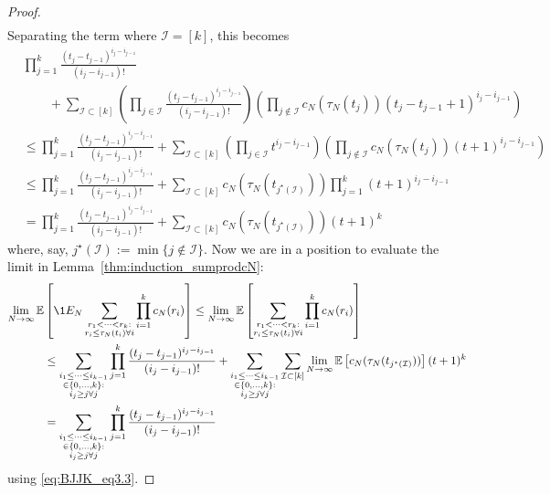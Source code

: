 \begin{proof}
\begin{align*}
\end{align*}
Separating the term where $\mathcal{I} = [k]$, this becomes
\begin{align*}        
& \prod_{j=1}^k \frac{(t_j - t_{j-1})^{i_j - i_{j-1}}}{(i_j - i_{j-1})!} \\
    &\qquad+ \sum_{\mathcal{I} \subset [k]} \left( \prod_{j\in\mathcal{I}} 
        \frac{(t_j - t_{j-1})^{i_j - i_{j-1}}}{(i_j - i_{j-1})!}\right)
        \left( \prod_{j\notin\mathcal{I}} c_N(\tau_N(t_j)) 
        ( t_j - t_{j-1} +1 )^{i_j - i_{j-1}} \right) \\
&\leq \prod_{j=1}^k \frac{(t_j - t_{j-1})^{i_j - i_{j-1}}}{(i_j - i_{j-1})!} 
    + \sum_{\mathcal{I} \subset [k]} \left( \prod_{j\in\mathcal{I}} 
        t^{i_j - i_{j-1}}\right)
        \left( \prod_{j\notin\mathcal{I}} c_N(\tau_N(t_j)) 
        (t+1)^{i_j - i_{j-1}} \right) \\
&\leq \prod_{j=1}^k \frac{(t_j - t_{j-1})^{i_j - i_{j-1}}}{(i_j - i_{j-1})!}
        + \sum_{\mathcal{I} \subset [k]} c_N(\tau_N(t_{j^\star(\mathcal{I})})) 
        \prod_{j=1}^k ( t+1 )^{i_j - i_{j-1}} \\
&=  \prod_{j=1}^k \frac{(t_j - t_{j-1})^{i_j - i_{j-1}}}{(i_j - i_{j-1})!}
        + \sum_{\mathcal{I} \subset [k]} c_N(\tau_N(t_{j^\star(\mathcal{I})})) 
        ( t+1 )^k 
\end{align*}
where, say, $j^\star(\mathcal{I}) := \min\{ j\notin\mathcal{I}\}$.
Now we are in a position to evaluate the limit in Lemma~\ref{thm:induction_sumprodcN}:
\begin{align*}
\lim_{N\to\infty} \E &\left[ \1{E_N} 
        \sum_{\substack{r_1<\dots<r_k :\\ r_i\leq \tau_N(t_i) \forall i}} 
        \prod_{i=1}^k c_N(r_i) \right] 
\leq \lim_{N\to\infty} \E \left[\sum_{\substack{r_1<\dots<r_k :\\ 
        r_i\leq \tau_N(t_i) \forall i}} \prod_{i=1}^k c_N(r_i) \right] \\
&\leq \sum_{\substack{i_1\leq \dots\leq i_{k-1}\\ \in \{0,\dots,k\} :\\ 
        i_j \geq j \forall j}} \prod_{j=1}^k \frac{(t_j - t_{j-1})^{i_j - i_{j-1}}}
        {(i_j - i_{j-1})!}
        + \sum_{\substack{i_1\leq \dots\leq i_{k-1}\\ \in \{0,\dots,k\} 
        :\\ i_j \geq j \forall j}} \sum_{\mathcal{I} \subset [k]} \lim_{N\to\infty} 
        \E \left[ c_N(\tau_N(t_{j^\star(\mathcal{I})})) \right] 
        (t+1)^k \\
&= \sum_{\substack{i_1\leq \dots\leq i_{k-1}\\ \in \{0,\dots,k\} :\\ 
        i_j \geq j \forall j}} \prod_{j=1}^k \frac{(t_j - t_{j-1})^{i_j - i_{j-1}}}
        {(i_j - i_{j-1})!}
\end{align*}
using \eqref{eq:BJJK_eq3.3}.


\end{proof}
